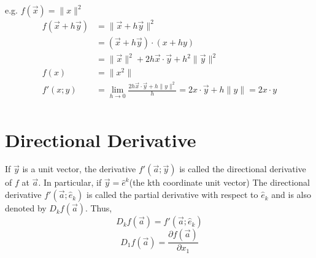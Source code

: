 \documentclass[twoside]{report}
\begin{document}
e.g. $f(\vec{x}) = \|x\|^2$
\begin{align*}
   f(\vec{x} + h\vec{y}) &= \|\vec{x}+h\vec{y}\|^2\\ 
			 &= (\vec{x} + h\vec{y}) \cdot (x+hy) \\ 
			 &= \| \vec{x}\|^2 + 2h\vec{x} \cdot \vec{y} + h^2 \| \vec{y} \|^2 \\ 
   f(x) &= \|x^2\| \\
   f'(x;y) &= \lim_{h \rightarrow 0} \frac{2h\vec{x}\cdot \vec{y} + h \|y\|^2}{h} = 2x\cdot \vec{y} + h\|y\| = 2x\cdot y \\
\end{align*}
\section{Directional Derivative} %
\label{sec:directional_derivative}
\begin{definition}
   If $\vec{y}$ is a unit vector, the derivative $f'(\vec{a};\vec{y})$ is called the directional derivative of $f$ at $\vec{a}$. In particular, if $\vec{y} = \hat{e}^k$(the kth coordinate unit vector) The directional derivative $f'(\vec{a}; \hat{e}_k)$ is called the partial derivative with respect to $\hat{e}_k$ and is also denoted by $D_k f(\vec{a})$. Thus,
   \[
   	D_k f(\vec{a}) = f'(\vec{a};\hat{e}_k)
   \]
   \[
      D_1 f(\vec{a}) = \frac{\partial f(\vec{a})}{\partial x_1}
   \]
\end{definition}
\end{document}
